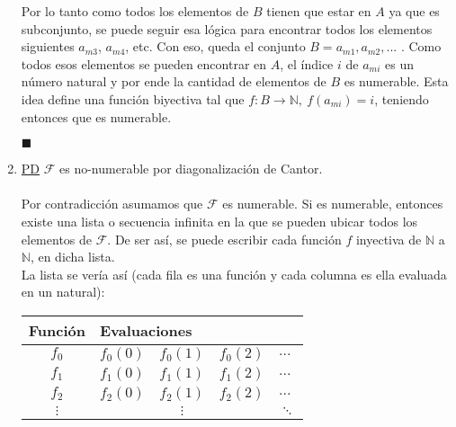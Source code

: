 \documentclass[letter]{article}
\begin{document}
\begin{pregunta}{1}
\begin{enumerate}
		Por lo tanto como todos los elementos de $B$ tienen que estar en $A$ ya que es subconjunto, se puede seguir esa lógica para encontrar todos los elementos siguientes $a_{m3}$, $a_{m4}$, etc. Con eso, queda el conjunto $B={a_{m1},a_{m2},...}$ . Como todos esos elementos se pueden encontrar en $A$, el índice $i$ de $a_{mi}$ es un número natural y por ende la cantidad de elementos de $B$ es numerable. Esta idea define una función biyectiva tal que  $f: B \rightarrow \mathbb{N},\ f(a_{mi})=i$, teniendo entonces que es numerable.
		\begin{flushright}$\blacksquare$\end{flushright}\vspace{30pt}
		\item \underline{PD} $\mathcal{F}$ es no-numerable por diagonalización de Cantor.\\\\
		Por contradicción asumamos que $\mathcal{F}$ es numerable. Si es numerable, entonces existe una lista o secuencia infinita en la que se pueden ubicar todos los elementos de $\mathcal{F}$. De ser así, se puede escribir cada función $f$ inyectiva de $\mathbb{N}$ a $\mathbb{N}$, en dicha lista.\\
		La lista se vería así (cada fila es una función y cada columna es ella evaluada en un natural):
		\begin{center}
			\begin{tabular}{c|llll}
				Función & \multicolumn{4}{l}{Evaluaciones}\\ \hline
				$f_0$&$f_0(0)$&$f_0(1)$&$f_0(2)$&$...$\\
				$f_1$&$f_1(0)$&$f_1(1)$&$f_1(2)$&$...$\\
				$f_2$&$f_2(0)$&$f_2(1)$&$f_2(2)$&$...$\\
				$\vdots$ & & \multicolumn{1}{c}{$\vdots$} & & $\ddots$
			\end{tabular}
		\end{center}
		

\end{enumerate}
\end{pregunta}
\end{document}
